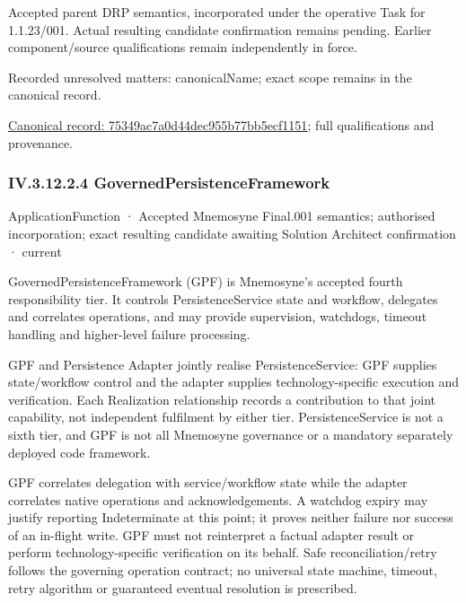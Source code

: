 Accepted parent DRP semantics, incorporated under the operative Task for 1.1.23/001. Actual resulting candidate confirmation remains pending. Earlier component/source qualifications remain independently in force.


{\small Recorded unresolved matters: canonicalName; exact scope remains in the canonical record.}\par
{\footnotesize \href{../../../../continuum/application/application-function/75349ac7a0d44dec955b77bb5ecf1151.md}{Canonical record: 75349ac7a0d44dec955b77bb5ecf1151}; full qualifications and provenance.}\par
\subsubsection*{IV.3.12.2.4 GovernedPersistenceFramework}
\label{navigation:IV.3.12.2.4}

\label{element:812fa47cef1442aeb34ec34f263616be}
{\small ApplicationFunction · Accepted Mnemosyne Final.001 semantics; authorised incorporation; exact resulting candidate awaiting Solution Architect confirmation · current}\par

GovernedPersistenceFramework (GPF) is Mnemosyne's accepted fourth responsibility tier. It controls PersistenceService state and workflow, delegates and correlates operations, and may provide supervision, watchdogs, timeout handling and higher-level failure processing.



GPF and Persistence Adapter jointly realise PersistenceService: GPF supplies state/workflow control and the adapter supplies technology-specific execution and verification. Each Realization relationship records a contribution to that joint capability, not independent fulfilment by either tier. PersistenceService is not a sixth tier, and GPF is not all Mnemosyne governance or a mandatory separately deployed code framework.



GPF correlates delegation with service/workflow state while the adapter correlates native operations and acknowledgements. A watchdog expiry may justify reporting Indeterminate at this point; it proves neither failure nor success of an in-flight write. GPF must not reinterpret a factual adapter result or perform technology-specific verification on its behalf. Safe reconciliation/retry follows the governing operation contract; no universal state machine, timeout, retry algorithm or guaranteed eventual resolution is prescribed.



